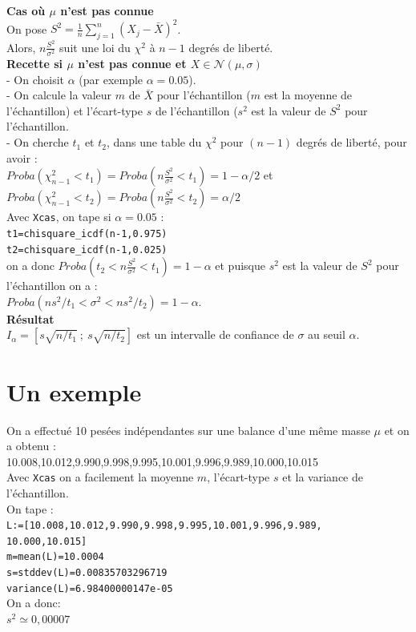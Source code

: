 \documentclass[a4paper,11pt]{book}
\begin{document}
{\bf Cas o\`u $\mu$ n'est pas connue}\\
On pose $S^2=\frac{1}{n}\sum_{j=1}^n(X_j-\bar X)^2$.\\
Alors, $\displaystyle n\frac{S^2}{\sigma^2}$ suit une loi du $\chi^2$ \`a $n-1$ degr\'es de libert\'e.\\
{\bf Recette si $\mu$ n'est pas connue et $X \in \mathcal N(\mu,\sigma)$}\\
- On choisit $\alpha$ (par exemple $\alpha=0.05$).\\
- On calcule la valeur $m$ de $\bar X$ pour l'\'echantillon ($m$ est la 
moyenne de l'\'echantillon) et 
 l'\'ecart-type $s$ de l'\'echantillon ($s^2$ est la valeur de $S^2$ pour 
l'\'echantillon. \\
- On cherche $t_1$ et $t_2$, dans une table du $\chi^2$ pour $(n-1)$ degr\'es 
de libert\'e, pour avoir :\\
$Proba(\chi_{n-1}^2<t_1)=Proba(n\frac{S^2}{\sigma^2}<t_1)=1-\alpha/2$ et\\
$Proba(\chi_{n-1}^2<t_2)=Proba(n\frac{S^2}{\sigma^2}<t_2)=\alpha/2$ \\
Avec {\tt Xcas}, on tape  si $\alpha=0.05$ :\\
{\tt t1=chisquare\_icdf(n-1,0.975)}\\
{\tt t2=chisquare\_icdf(n-1,0.025)}\\
on a donc $Proba(t_2<n\frac{S^2}{\sigma^2}<t_1)=1-\alpha$ et puisque
$s^2$ est la valeur de $S^2$ pour l'\'echantillon on a :\\ 
$Proba(ns^2/t_1<\sigma^2<ns^2/t_2)=1-\alpha$.\\
{\bf R\'esultat}\\
$I_{\alpha}=[s\sqrt{n/t_1}\ ;\ s\sqrt{n/t_2}]$ est un intervalle de 
confiance de $\sigma$ au seuil $\alpha$.
\section{Un exemple}
On a effectu\'e 10 pes\'ees ind\'ependantes sur une balance d'une m\^eme masse 
$\mu$ et on a obtenu :\\
10.008,10.012,9.990,9.998,9.995,10.001,9.996,9.989,10.000,10.015\\
Avec {\tt Xcas} on a facilement la moyenne $m$, l'\'ecart-type $s$ et la 
variance de l'\'echantillon.\\
On tape :\\
{\tt L:=[10.008,10.012,9.990,9.998,9.995,10.001,9.996,9.989,\\10.000,10.015]}\\
{\tt m=mean(L)=10.0004}\\
{\tt s=stddev(L)=0.00835703296719}\\
{\tt variance(L)=6.98400000147e-05}\\
On a donc:\\
$s^2 \simeq 0,00007$
\end{document}
